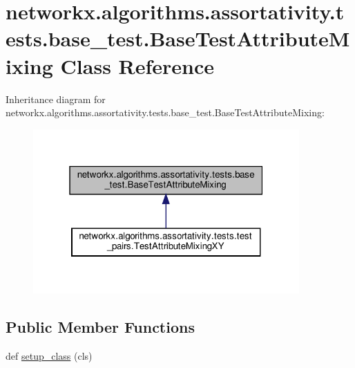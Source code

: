 \hypertarget{classnetworkx_1_1algorithms_1_1assortativity_1_1tests_1_1base__test_1_1BaseTestAttributeMixing}{}\section{networkx.\+algorithms.\+assortativity.\+tests.\+base\+\_\+test.\+Base\+Test\+Attribute\+Mixing Class Reference}
\label{classnetworkx_1_1algorithms_1_1assortativity_1_1tests_1_1base__test_1_1BaseTestAttributeMixing}


Inheritance diagram for networkx.\+algorithms.\+assortativity.\+tests.\+base\+\_\+test.\+Base\+Test\+Attribute\+Mixing\+:
\nopagebreak
\begin{figure}[H]
\begin{center}
\leavevmode
\includegraphics[width=289pt]{classnetworkx_1_1algorithms_1_1assortativity_1_1tests_1_1base__test_1_1BaseTestAttributeMixing__inherit__graph}
\end{center}
\end{figure}
\subsection*{Public Member Functions}
\begin{DoxyCompactItemize}
\item 
def \hyperlink{classnetworkx_1_1algorithms_1_1assortativity_1_1tests_1_1base__test_1_1BaseTestAttributeMixing_a46bde4c60fb4f5e4f6f9059ed028b194}{setup\+\_\+class} (cls)
\end{DoxyCompactItemize}
